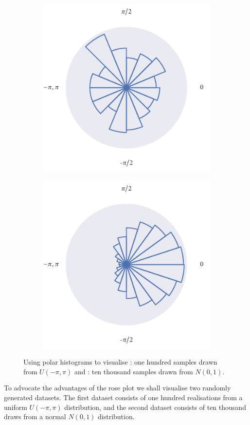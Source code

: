 \begin{figure}[tb]
	\begin{subfigure}[b]{0.45\textwidth}
		\includegraphics{unif_angle_rose.pdf}
		\caption{}
		\label{subfig:unif_angle_rose}
	\end{subfigure}%
	\hspace{0.05\textwidth}%
	\begin{subfigure}[b]{0.45\textwidth}
		\includegraphics{norm_angle_rose.pdf}
		\caption{}
		\label{subfig:norm_angle_rose}
	\end{subfigure}
    \caption{Using polar histograms to visualise : one
    hundred samples drawn from $U(-\pi, \pi)$ and : ten
    thousand samples drawn from $N(0, 1)$.}
    \label{fig:angle_rose}
\end{figure}
To advocate the advantages of the rose plot we shall visualise two randomly generated
datasets. The first dataset consists of one hundred realisations from a uniform
$U(-\pi,\pi)$ distribution, and the second dataset consists of ten thousand draws from a
normal $N(0, 1)$ distribution.

